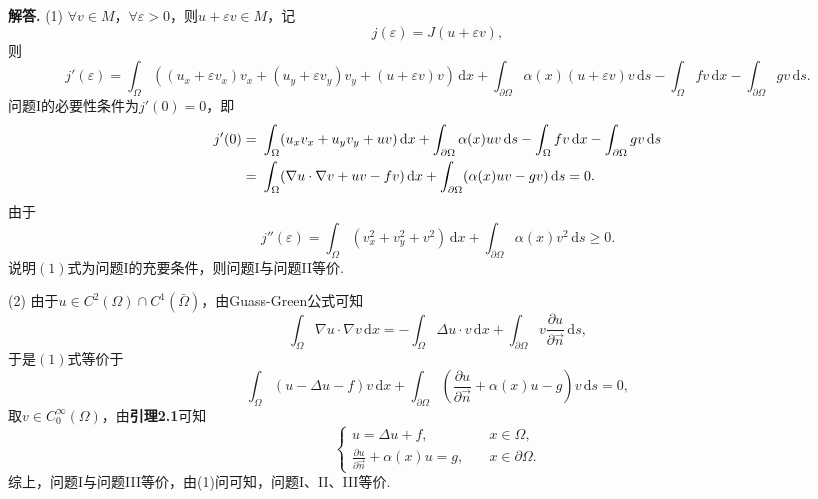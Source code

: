 \documentclass[12pt, a4paper, oneside]{ctexart}
\newenvironment{solution}{\par\noindent\textbf{解答. }}{\smallskip\par}
\let\geq=\geqslant %
\def\d{\mathrm{d}}          %
\begin{document}
\begin{solution}
    (1) $\forall v\in M$，$\forall \varepsilon > 0$，则$u+\varepsilon v\in M$，记
    \begin{equation*}
        j(\varepsilon) = J(u+\varepsilon v),
    \end{equation*}
    则
    \begin{equation*}
        j'(\varepsilon) = \int_{\Omega}((u_x+\varepsilon v_x)v_x+(u_y+\varepsilon v_y)v_y+(u+\varepsilon v) v)\,\d x + \int_{\partial \Omega}\alpha(x)(u+\varepsilon v)v\,\d s-\int_{\Omega}fv\,\d x-\int_{\partial \Omega}gv\,\d s.
    \end{equation*}
    问题I的必要性条件为$j'(0) = 0$，即
    \begin{align}
        \notag j'(0) =&\ \int_{\Omega}(u_xv_x+u_yv_y+uv)\,\d x+\int_{\partial \Omega}\alpha(x)uv\,\d s - \int_{\Omega}fv\,\d x-\int_{\partial \Omega}gv\,\d s\\
        =&\ \int_{\Omega}(\nabla u\cdot \nabla v+u v-fv)\,\d x+\int_{\partial \Omega}(\alpha(x)uv-gv)\,\d s=0.
    \end{align}
    由于
    \begin{equation*}
        j''(\varepsilon) = \int_{\Omega}(v_x^2+v_y^2+v^2)\,\d x+\int_{\partial \Omega}\alpha(x)v^2\,\d s\geq 0.
    \end{equation*}
    说明$(1)$式为问题I的充要条件，则问题I与问题II等价.

    (2) 由于$u\in C^2(\Omega)\cap C^1(\bar{\Omega})$，由Guass-Green公式可知
    \begin{equation*}
        \int_{\Omega}\nabla u\cdot \nabla v\,\d x = -\int_{\Omega}\Delta u\cdot v\,\d x+\int_{\partial \Omega}v\frac{\partial u}{\partial\vec{n}}\,\d s,
    \end{equation*}
    于是$(1)$式等价于
    \begin{equation*}
        \int_{\Omega}(u-\Delta u-f)v\,\d x+\int_{\partial \Omega}\left(\frac{\partial u}{\partial \vec{n}}+\alpha(x)u-g\right)v\,\d s=0,
    \end{equation*}
    取$v\in C_0^{\infty}(\Omega)$，由\textbf{引理2.1}可知
    \begin{equation*}
        \begin{cases}
            u = \Delta u  +f,&\quad x\in\Omega,\\
            \frac{\partial u}{\partial \vec{n}}+\alpha(x)u=g,&\quad x\in\partial\Omega.
        \end{cases}
    \end{equation*}
    综上，问题I与问题III等价，由(1)问可知，问题I、II、III等价.
\end{solution}
\end{document}
